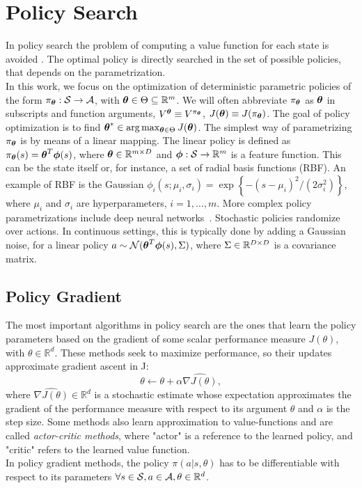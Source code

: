 \section{Policy Search}\label{sec:polser}
In policy search the problem of computing a value function for each state is avoided . The optimal policy is directly searched in the set of possible policies, that depends on the parametrization.\\
\newline
In this work, we focus on the optimization of deterministic parametric policies of the form $\pi_{\boldsymbol{\theta}}:\mathcal{S}\to\mathcal{A}$, with $\boldsymbol{\theta}\in\Theta\subseteq\mathbb{R}^m$. We will often abbreviate $\pi_{\boldsymbol{\theta}}$ as $\boldsymbol{\theta}$ in subscripts and function arguments, \eg $V^{\boldsymbol{\theta}} \equiv V^{\pi_{\boldsymbol{\theta}}}$, $J(\boldsymbol{\theta}) \equiv J(\pi_{\boldsymbol{\theta}})$. The goal of policy optimization is to find $\boldsymbol{\theta}^{*}\in\arg\max_{\boldsymbol{\theta}\in\Theta}J({\boldsymbol{\theta}})$.
The simplest way of parametrizing $\pi_{\boldsymbol{\theta}}$ is by means of a linear mapping. The linear policy is defined as $\pi_{\boldsymbol{\theta}}(s) = \boldsymbol{\theta}^T\boldsymbol{\phi}(s)$, where $\boldsymbol{\theta}\in\mathbb{R}^{m\times D}$ and $\boldsymbol{\phi}:\mathcal{S}\to\mathbb{R}^m$ is a feature function. This can be the state itself or, for instance, a set of radial basis functions (RBF). An example of RBF is the Gaussian $\phi_i(s; \mu_i, \sigma_i) = \exp\left\{-{(s -\mu_i)^2}\big/{(2\sigma_i^2)}\right\}$, where $\mu_i$ and $\sigma_i$ are hyperparameters, $i=1,\dots,m$. More complex policy parametrizations include deep neural networks~\citep{duan2016benchmarking}. 
Stochastic policies randomize over actions. In continuous settings, this is typically done by adding a Gaussian noise, \eg for a linear policy $a\sim\mathcal{N}(\boldsymbol{\theta}^T\boldsymbol{\phi}(s),\Sigma)$, where $\Sigma\in\mathbb{R}^{D\times D}$ is a covariance matrix.

\subsection{Policy Gradient}
The most important algorithms in policy search are the ones that learn the policy parameters based on the gradient of some scalar performance measure $J(\theta)$, with $\theta \in \mathbb{R}^d$. These methods seek to maximize performance, so their updates approximate gradient ascent in J:
$$ \theta \leftarrow \theta + \alpha \widehat{\nabla J(\theta)},$$
where $\widehat{\nabla J(\theta)} \in \mathbb{R}^d$ is a stochastic estimate whose expectation approximates the gradient of the performance measure with respect to its argument $\theta$ and $\alpha$ is the step size. Some methods also learn approximation to value-functions and are called \emph{actor-critic methods}, where "actor" is a reference to the learned policy, and "critic" refers to the learned value function.\\
\newline
In policy gradient methods, the policy $\pi(a|s,\theta)$ has to be differentiable with respect to its parameters $\forall s \in \mathcal{S}, a \in \mathcal{A}, \theta \in \mathbb{R}^d$.

